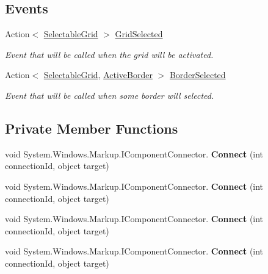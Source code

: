 \subsection*{Events}
\begin{DoxyCompactItemize}
\item 
Action$<$ \mbox{\hyperlink{class_wpf_handler_1_1_u_i_1_1_controls_1_1_selectable_grid}{Selectable\+Grid}} $>$ \mbox{\hyperlink{class_wpf_handler_1_1_u_i_1_1_controls_1_1_selectable_grid_ab6cfd75acc443340a49f28376ee093ea}{Grid\+Selected}}
\begin{DoxyCompactList}\small\item\em Event that will be called when the grid will be activated. \end{DoxyCompactList}\item 
Action$<$ \mbox{\hyperlink{class_wpf_handler_1_1_u_i_1_1_controls_1_1_selectable_grid}{Selectable\+Grid}}, \mbox{\hyperlink{class_wpf_handler_1_1_u_i_1_1_controls_1_1_selectable_grid_1_1_active_border}{Active\+Border}} $>$ \mbox{\hyperlink{class_wpf_handler_1_1_u_i_1_1_controls_1_1_selectable_grid_acb900c70331edb5a8a371414915985f8}{Border\+Selected}}
\begin{DoxyCompactList}\small\item\em Event that will be called when some border will selected. \end{DoxyCompactList}\end{DoxyCompactItemize}
\subsection*{Private Member Functions}
\begin{DoxyCompactItemize}
\item 
\mbox{\label{class_wpf_handler_1_1_u_i_1_1_controls_1_1_selectable_grid_a9c398cc7ff1a15b9ee8abd61e9e13e42}} 
void System.\+Windows.\+Markup.\+I\+Component\+Connector. {\bfseries Connect} (int connection\+Id, object target)
\item 
\mbox{\label{class_wpf_handler_1_1_u_i_1_1_controls_1_1_selectable_grid_a9c398cc7ff1a15b9ee8abd61e9e13e42}} 
void System.\+Windows.\+Markup.\+I\+Component\+Connector. {\bfseries Connect} (int connection\+Id, object target)
\item 
\mbox{\label{class_wpf_handler_1_1_u_i_1_1_controls_1_1_selectable_grid_a9c398cc7ff1a15b9ee8abd61e9e13e42}} 
void System.\+Windows.\+Markup.\+I\+Component\+Connector. {\bfseries Connect} (int connection\+Id, object target)
\item 
\mbox{\label{class_wpf_handler_1_1_u_i_1_1_controls_1_1_selectable_grid_a9c398cc7ff1a15b9ee8abd61e9e13e42}} 
void System.\+Windows.\+Markup.\+I\+Component\+Connector. {\bfseries Connect} (int connection\+Id, object target)
\end{DoxyCompactItemize}
